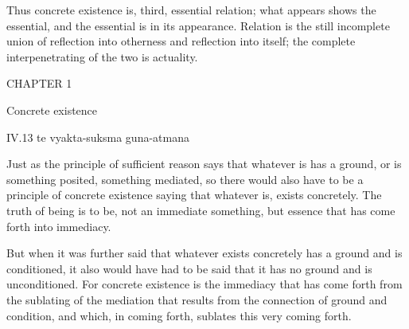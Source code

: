 Thus concrete existence is, third, essential relation;
what appears shows the essential,
and the essential is in its appearance.
Relation is the still incomplete union of
reflection into otherness and reflection into itself;
the complete interpenetrating of the two is actuality.

CHAPTER 1

Concrete existence

IV.13
te vyakta-suksma guna-atmana

Just as the principle of sufficient reason says
that whatever is has a ground,
or is something posited,
something mediated,
so there would also have to be
a principle of concrete existence saying
that whatever is, exists concretely.
The truth of being is to be,
not an immediate something,
but essence that has
come forth into immediacy.

But when it was further said
that whatever exists concretely
has a ground and is conditioned,
it also would have had to be said
that it has no ground and is unconditioned.
For concrete existence is the immediacy
that has come forth from the sublating
of the mediation that results
from the connection of ground and condition,
and which, in coming forth,
sublates this very coming forth.

